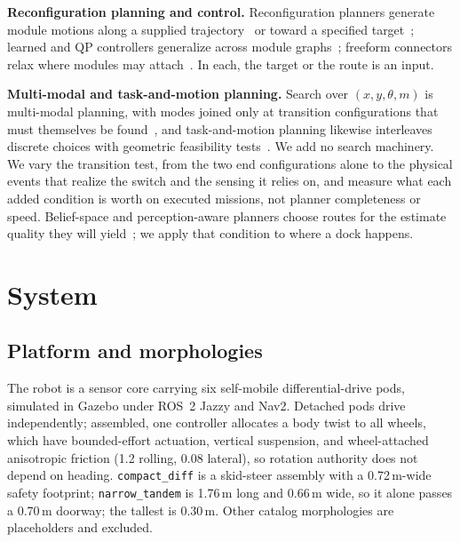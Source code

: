 \documentclass[conference]{IEEEtran}
\newcommand{\method}[1]{\texttt{#1}}
\begin{document}
\textbf{Reconfiguration planning and control.} Reconfiguration planners generate module motions along a supplied trajectory~\cite{yoshida2002reconfig} or toward a specified target~\cite{liu2019distributed}; learned and QP controllers generalize across module graphs~\cite{whitman2023modular,liu2020qp}; freeform connectors relax where modules may attach~\cite{liang2020freebot}. In each, the target or the route is an input.

\textbf{Multi-modal and task-and-motion planning.} Search over $(x, y, \theta, m)$ is multi-modal planning, with modes joined only at transition configurations that must themselves be found~\cite{hauser2010multimodal}, and task-and-motion planning likewise interleaves discrete choices with geometric feasibility tests~\cite{garrett2021tamp}. We add no search machinery. We vary the transition test, from the two end configurations alone to the physical events that realize the switch and the sensing it relies on, and measure what each added condition is worth on executed missions, not planner completeness or speed. Belief-space and perception-aware planners choose routes for the estimate quality they will yield~\cite{prentice2009brm,zhang2018perception}; we apply that condition to where a dock happens.

\section{System}

\subsection{Platform and morphologies}
The robot is a sensor core carrying six self-mobile differential-drive pods, simulated in Gazebo under ROS~2 Jazzy and Nav2. Detached pods drive independently; assembled, one controller allocates a body twist to all wheels, which have bounded-effort actuation, vertical suspension, and wheel-attached anisotropic friction (1.2 rolling, 0.08 lateral), so rotation authority does not depend on heading. \method{compact\_diff} is a skid-steer assembly with a 0.72\,m-wide safety footprint; \method{narrow\_tandem} is 1.76\,m long and 0.66\,m wide, so it alone passes a 0.70\,m doorway; the tallest is 0.30\,m. Other catalog morphologies are placeholders and excluded.
\end{document}
